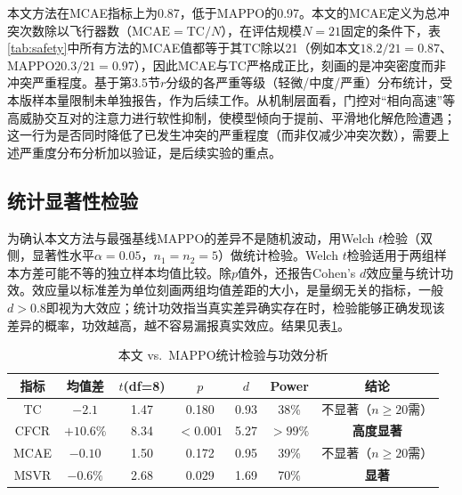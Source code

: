 \documentclass[12pt,a4paper,UTF8]{ctexart}
\begin{document}
本文方法在MCAE指标上为0.87，低于MAPPO的0.97。本文的MCAE定义为总冲突次数除以飞行器数（$\mathrm{MCAE}=\mathrm{TC}/N$），在评估规模$N=21$固定的条件下，表\ref{tab:safety}中所有方法的MCAE值都等于其TC除以21（例如本文$18.2/21=0.87$、MAPPO$20.3/21=0.97$），因此MCAE与TC严格成正比，刻画的是冲突密度而非冲突严重程度。基于第3.5节$r$分级的各严重等级（轻微/中度/严重）分布统计，受本版样本量限制未单独报告，作为后续工作。从机制层面看，门控对“相向高速”等高威胁交互对的注意力进行软性抑制，使模型倾向于提前、平滑地化解危险遭遇；这一行为是否同时降低了已发生冲突的严重程度（而非仅减少冲突次数），需要上述严重度分布分析加以验证，是后续实验的重点。

\subsection{统计显著性检验}

为确认本文方法与最强基线MAPPO的差异不是随机波动，用Welch $t$检验\cite{ref42}（双侧，显著性水平$\alpha=0.05$，$n_1=n_2=5$）做统计检验。Welch $t$检验适用于两组样本方差可能不等的独立样本均值比较。除$p$值外，还报告Cohen's $d$效应量\cite{ref43}与统计功效。效应量以标准差为单位刻画两组均值差距的大小，是量纲无关的指标，一般$d>0.8$即视为大效应；统计功效指当真实差异确实存在时，检验能够正确发现该差异的概率，功效越高，越不容易漏报真实效应。结果见表\ref{tab:ttest}。

\begin{table}[H]
    \centering
    \caption{本文 vs.\ MAPPO统计检验与功效分析}
    \label{tab:ttest}
    \begin{tabular}{|c|c|c|c|c|c|c|}
        \hline
        \textbf{指标} & \textbf{均值差} & \textbf{$t$(df=8)} & \textbf{$p$} & \textbf{$d$} & \textbf{Power} & \textbf{结论} \\
        \hline
        TC & $-2.1$ & 1.47 & 0.180 & 0.93 & 38\% & 不显著（$n\geq20$需） \\
        CFCR & $+10.6\%$ & 8.34 & $<0.001$ & 5.27 & $>99\%$ & \textbf{高度显著} \\
        MCAE & $-0.10$ & 1.50 & 0.172 & 0.95 & 39\% & 不显著（$n\geq20$需） \\
        MSVR & $-0.6\%$ & 2.68 & 0.029 & 1.69 & 70\% & \textbf{显著} \\
        \hline
    \end{tabular}
\end{table}
\end{document}
